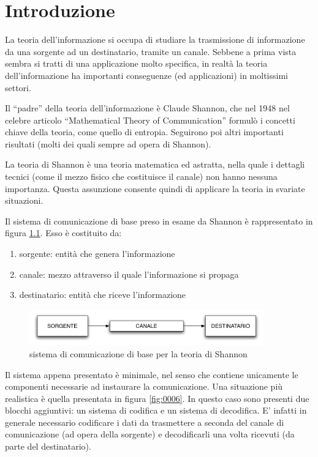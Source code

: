 \chapter{Introduzione}
La teoria dell'informazione si occupa di studiare la trasmissione di informazione da una sorgente ad un destinatario, tramite un canale.
Sebbene a prima vista sembra si tratti di una applicazione molto specifica, in realtà la teoria dell'informazione ha importanti 
conseguenze (ed applicazioni) in moltissimi settori.

Il ``padre'' della teoria dell'informazione è Claude Shannon, che nel 1948 nel celebre articolo ``Mathematical Theory of Communication'' formulò i concetti chiave della teoria, come quello di entropia. Seguirono poi altri importanti risultati (molti dei 
quali sempre ad opera di Shannon).

La teoria di Shannon è una teoria matematica ed astratta, nella quale i dettagli tecnici (come il mezzo fisico che costituisce il canale) non hanno nessuna importanza. Questa assunzione consente quindi di applicare la teoria in svariate situazioni.

Il sistema di comunicazione di base preso in esame da Shannon è rappresentato in figura \ref{fig:0005}.
Esso è costituito da:
\begin{enumerate}
\item sorgente: entità che genera l'informazione
\item canale: mezzo attraverso il quale l'informazione si propaga
\item destinatario: entità che riceve l'informazione
\end{enumerate}

\begin{figure}[htbp]
\begin{center}
	\includegraphics[width=0.9\textwidth]{img/intro1.pdf}
\caption{sistema di comunicazione di base per la teoria di Shannon}
\label{fig:0005}
\end{center}
\end{figure}

Il sistema appena presentato è minimale, nel senso che contiene unicamente le componenti necessarie ad instaurare 
la comunicazione. Una situazione più realistica è quella presentata in figura \ref{fig:0006}. In questo caso sono presenti 
due blocchi aggiuntivi: un sistema di codifica e un sistema di decodifica.
E' infatti in generale necessario codificare i dati da trasmettere a seconda del canale di comunicazione (ad opera della sorgente) e decodificarli una volta ricevuti (da parte del destinatario).

